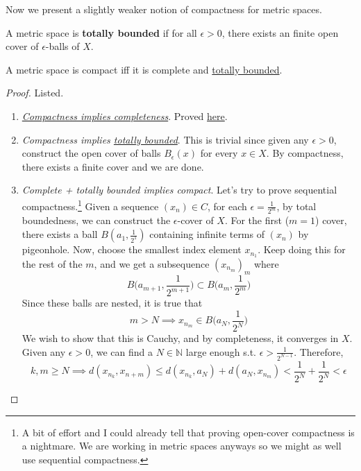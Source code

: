 	Now we present a slightly weaker notion of compactness for metric spaces. 

	\begin{definition}
	  \label{def:totally-bounded}
	  A metric space is \textbf{totally bounded} if for all $\epsilon > 0$, there exists an finite open cover of $\epsilon$-balls of $X$. 
	\end{definition}

  \begin{theorem}
    \label{thm:compact-metric-spaces-are-complete}
    A metric space is compact iff it is complete and \hyperref[def:totally-bounded]{totally bounded}. 
  \end{theorem}
  \begin{proof}
    Listed. 
		\begin{enumerate}
			\item \textit{\hyperref[thm:compact_complete]{Compactness implies completeness}}. Proved \hyperref[thm:compact_complete]{here}. 

			\item \textit{Compactness implies \hyperref[def:totally-bounded]{totally bounded}}. This is trivial since given any $\epsilon > 0$, construct the open cover of balls $B_\epsilon (x)$ for every $x \in X$. By compactness, there exists a finite cover and we are done. 

			\item \textit{Complete + totally bounded implies compact}. Let's try to prove sequential compactness.\footnote{A bit of effort and I could already tell that proving open-cover compactness is a nightmare. We are working in metric spaces anyways so we might as well use sequential compactness.} Given a sequence $(x_n) \in C$, for each $\epsilon = \frac{1}{2^m}$, by total boundedness, we can construct the $\epsilon$-cover of $X$. For the first ($m=1$) cover, there exists a ball $B(a_1, \frac{1}{2^1})$ containing infinite terms of $(x_n)$ by pigeonhole. Now, choose the smallest index element $x_{n_1}$. Keep doing this for the rest of the $m$, and we get a subsequence $(x_{n_m})_m$ where 
				\begin{equation}
					B \big( a_{m+1}, \frac{1}{2^{m+1}} \big) \subset B \big( a_{m}, \frac{1}{2^{m}} \big)
				\end{equation}
				Since these balls are nested, it is true that 
				\begin{equation}
					m > N \implies x_{n_m} \in B \big( a_N, \frac{1}{2^N} \big)
				\end{equation}
				We wish to show that this is Cauchy, and by completeness, it converges in $X$. Given any $\epsilon > 0$, we can find a $N \in \mathbb{N}$ large enough s.t. $\epsilon > \frac{1}{2^{N-1}}$. Therefore, 
				\begin{equation}
					k, m \geq N \implies d(x_{n_k}, x_{n+m}) \leq d(x_{n_k}, a_N) + d(a_N, x_{n_m}) < \frac{1}{2^{N}} + \frac{1}{2^N} < \epsilon
				\end{equation}
		\end{enumerate}
  \end{proof}

